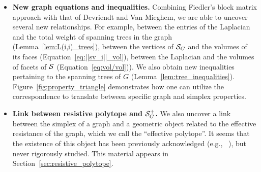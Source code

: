 \begin{itemize}
	
	\item {\bf New graph equations and inequalities.} 	Combining Fiedler's block matrix approach with that of Devriendt and Van Mieghem, we are able to uncover several new relationships. 
	For example, between the  entries of the Laplacian and the total  weight of spanning trees in  the graph (Lemma~\ref{lem:L(i,i)_trees}), between the vertices of $\mathcal{S}_G$  and the volumes of its faces (Equation~\eqref{eq:||sv_i||_vol}), between the Laplacian and the volumes of facets of $\mathcal{S}$ (Equation~\eqref{eq:vol/vol})). We also  obtain new inequalities pertaining to the spanning trees of $G$ (Lemma~\ref{lem:tree_inequalities}). Figure~\ref{fig:property_triangle}  demonstrates how one can utilize the correspondence to translate between specific graph and simplex properties. 
	
	
	\item {\bf Link between resistive polytope and $\mathcal{S}_G^+$.} We also uncover a link between the simplex of a graph and a geometric  object related to the effective resistance of the graph, which we call the ``effective polytope''. It seems that the existence of this object has been previously acknowledged (e.g., ~\cite{shayanNotes}), but never rigorously studied. This material appears in Section~\ref{sec:resistive_polytope}. 
	

\end{itemize}

